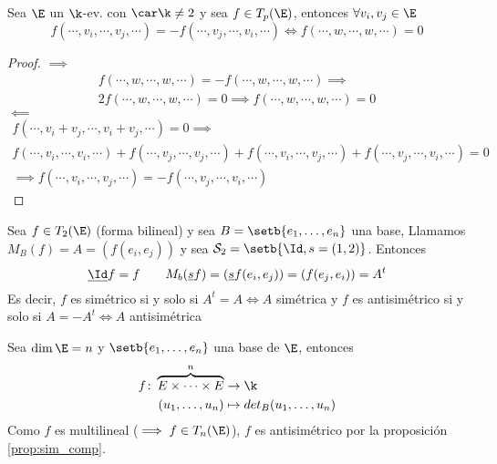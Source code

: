 \begin{prop}
    Sea $ \E $ un $ \k $-ev.  con $ \car \k \neq 2 $ y sea $ f \in T_p(\E)
    $, entonces $ \forall v_i, v_j \in \E $
    \[
        f(\cdots, v_i, \cdots, v_j, \cdots) = -f(\cdots,v_j,\cdots,v_i,\cdots)
        \iff f(\cdots, w, \cdots, w, \cdots) = 0
    \]
\end{prop}
\begin{proof}
    $ \implies $
    \begin{gather*}
        f(\cdots,w,\cdots,w,\cdots) = - f(\cdots,w,\cdots,w,\cdots)
        \implies \\
        2f(\cdots,w,\cdots,w,\cdots) = 0 \implies f(\cdots,w,\cdots,w,\cdots)
        = 0
    \end{gather*}
    $ \impliedby $
    \begin{gather*}
        f(\cdots, v_i+v_j, \cdots, v_i+v_j, \cdots) = 0 \implies \\
        f(\cdots,v_i,\cdots,v_i,\cdots) + f(\cdots,v_j,\cdots,v_j,\cdots)
        + f(\cdots,v_i,\cdots,v_j,\cdots) + f(\cdots,v_j,\cdots,v_i,\cdots)
        = 0 \\
        \implies f(\cdots,v_i,\cdots,v_j,\cdots) = -f(\cdots,v_j,\cdots,v_i,\cdots)
    \end{gather*}
\end{proof}
\begin{example}
    Sea $ f \in T_2(\E) $ (forma bilineal) y sea $ B = \setb{e_1,\dots,e_n}
    $ una base, Llamamos $ M_B(f) = A = \left( f(e_i,e_j) \right) $ y
    sea $ \mathcal{S}_2 = \setb{\Id, s=(1,2)} $. Entonces
    \[
        \underline{\Id}f = f \qquad M_b(\underline{s}f)= \left(
        \underline{s}f(e_i,e_j) \right) = \left( f(e_j,e_i) \right) = A^t
    \]
    Es decir, $ f $ es simétrico si y solo si $ A^t = A \iff A $
    simétrica y $ f $ es antisimétrico si y solo si $ A = -A^t \iff A $
    antisimétrica
\end{example}
\begin{example}
    Sea $ \dim \E = n $ y $ \setb{e_1,\dots,e_n} $ una base de $ \E $,
    entonces
    \[
        \begin{aligned}
            f \colon \overbrace{E \times \cdots \times E}^n &\to \k \\
            (u_1,\dots,u_n) &\mapsto det_B(u_1,\dots,u_n)
        \end{aligned}
    \]
    Como $ f $ es multilineal ($ \implies f \in T_n(\E) $), $ f $ es
    antisimétrico por la proposición%
    \ref{prop:sim_comp}.
\end{example}
